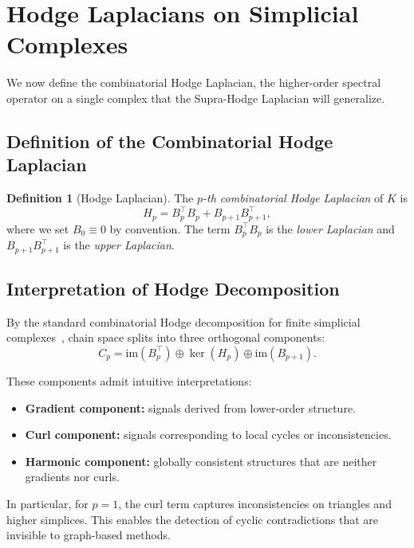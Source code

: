 \documentclass[11pt]{article}
\theoremstyle{definition}
\newtheorem{definition}[theorem]{Definition}
\theoremstyle{remark}
\begin{document}
\section{Hodge Laplacians on Simplicial Complexes}
\label{sec:hodge}

We now define the combinatorial Hodge Laplacian, the higher-order spectral
operator on a single complex that the Supra-Hodge Laplacian will generalize.

\subsection{Definition of the Combinatorial Hodge Laplacian}

\begin{definition}[Hodge Laplacian]
The \emph{$p$-th combinatorial Hodge Laplacian} of $K$ is
\[
  H_p = B_p^\top B_p + B_{p+1}B_{p+1}^\top,
\]
where we set $B_0\equiv 0$ by convention. The term $B_p^\top B_p$ is the
\emph{lower Laplacian} and $B_{p+1}B_{p+1}^\top$ is the \emph{upper Laplacian}.
\end{definition}

\subsection{Interpretation of Hodge Decomposition}

By the standard combinatorial Hodge decomposition for finite simplicial
complexes~\cite{horak2013,schaub2020,lim2020}, chain space splits into three
orthogonal components:
\[
C_p = \mathrm{im}(B_p^\top) \oplus \ker(H_p) \oplus \mathrm{im}(B_{p+1}).
\]

These components admit intuitive interpretations:
\begin{itemize}
    \item \textbf{Gradient component:} signals derived from lower-order structure.
    \item \textbf{Curl component:} signals corresponding to local cycles or inconsistencies.
    \item \textbf{Harmonic component:} globally consistent structures that are neither gradients nor curls.
\end{itemize}

In particular, for $p = 1$, the curl term captures inconsistencies on triangles and higher simplices. This enables the detection of cyclic contradictions that are invisible to graph-based methods.
\end{document}
